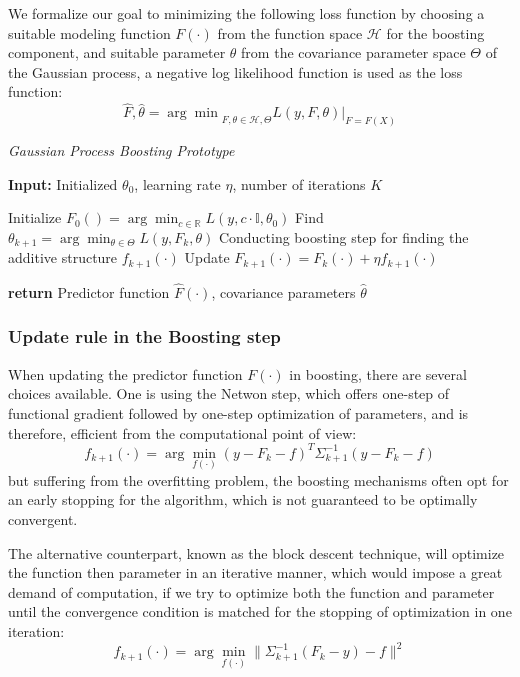 \documentclass[12pt,a4paper]{article}
\begin{document}
We formalize our goal to minimizing the following loss function by choosing a suitable modeling function $F(\cdot)$ from the function space $\mathcal{H}$ for the boosting component, and suitable parameter $\theta$ from the covariance parameter space $\Theta$ of the Gaussian process, a negative log likelihood function is used as the loss function:
$$
\hat{F}, \hat{\theta} = {\arg\min}_{F, \theta \in \mathcal{H}, \Theta} L(y, F, \theta) \big|_{F = F(X)}
$$

\begin{algorithm}
\caption{\textit{Gaussian Process Boosting Prototype}}\label{alg:prototype}
\begin{algorithmic}[1]
\State \textbf{Input:} Initialized $\theta_0$, learning rate $\eta$, number of iterations $K$

\State Initialize $F_0() = \arg\min_{c \in \mathbb{R}} L(y, c\cdot \mathbb{I}, \theta_0)$
    \State Find $\theta_{k+1} = \arg\min_{\theta \in \Theta} L(y, F_{k}, \theta)$
    \State Conducting boosting step for finding the additive structure $f_{k+1}(\cdot)$
    \State Update $F_{k+1}(\cdot) = F_{k}(\cdot) + \eta f_{k+1}(\cdot)$
\EndFor

\State \textbf{return} Predictor function $\hat{F}(\cdot)$, covariance parameters $\hat{\theta}$
\end{algorithmic}
\end{algorithm}


\subsubsection{Update rule in the Boosting step}
When updating the predictor function $F(\cdot)$ in boosting, there are several choices available. One is using the Netwon step, which offers one-step of functional gradient followed by one-step optimization of parameters, and is therefore, efficient from the computational point of view:
$$
f_{k+1}(\cdot) = \arg\min_{f(\cdot)} (y - F_{k} - f)^T \Sigma_{k+1}^{-1} (y - F_{k} - f)
$$
but suffering from the overfitting problem, the boosting mechanisms often opt for an early stopping for the algorithm, which is not guaranteed to be optimally convergent. 

The alternative counterpart, known as the block descent technique, will optimize the function then parameter in an iterative manner, which would impose a great demand of computation, if we try to optimize both the function and parameter until the convergence condition is matched for the stopping of optimization in one iteration:
$$
f_{k+1}(\cdot) = \arg\min_{f(\cdot)} \| \Sigma_{k+1}^{-1} (F_{k} - y) - f \|^2
$$
\end{document}
